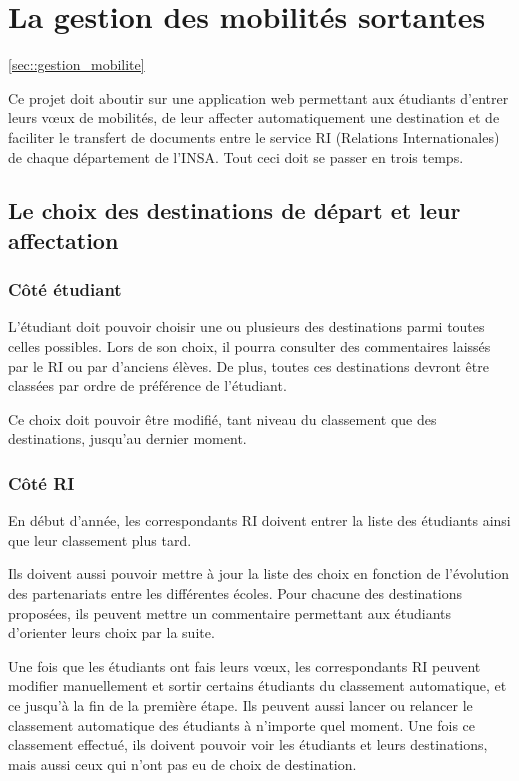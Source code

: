
		\section{La gestion des mobilités sortantes}
		\ref{sec::gestion_mobilite}
		
		Ce projet doit aboutir sur une application web permettant aux étudiants d'entrer leurs vœux de mobilités, de leur affecter automatiquement une destination et de faciliter le transfert de documents entre le service RI (Relations Internationales) de chaque département de l'INSA. Tout ceci doit se passer en trois temps.
		
		 \subsection{Le choix des destinations de départ et leur affectation}
		 
		 \subsubsection{Côté étudiant}
		 
		 L'étudiant doit pouvoir choisir une ou plusieurs des destinations parmi toutes celles possibles. Lors de son choix, il pourra consulter des commentaires laissés par le RI ou par d'anciens élèves. De plus, toutes ces destinations devront être classées par ordre de préférence de l'étudiant.
		 
		 Ce choix doit pouvoir être modifié, tant niveau du classement que des destinations, jusqu'au dernier moment.
		 
		\subsubsection{Côté RI}
		
		En début d'année, les correspondants RI doivent entrer la liste des étudiants ainsi que leur classement plus tard. 
		
		Ils doivent aussi pouvoir mettre à jour la liste des choix en fonction de l'évolution des partenariats entre les différentes écoles. Pour chacune des destinations proposées, ils peuvent mettre un commentaire permettant aux étudiants d'orienter leurs choix par la suite.
		
		Une fois que les étudiants ont fais leurs vœux, les correspondants RI peuvent modifier manuellement et sortir certains étudiants du classement automatique, et ce jusqu'à la fin de la première étape. Ils peuvent aussi lancer ou relancer le classement automatique des étudiants à n'importe quel moment. Une fois ce classement effectué, ils doivent pouvoir voir les étudiants et leurs destinations, mais aussi ceux qui n'ont pas eu de choix de destination.
